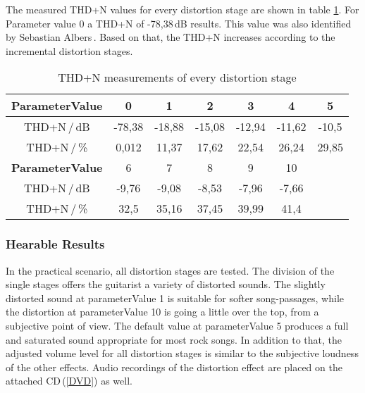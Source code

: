 The measured THD+N values for every distortion stage are shown in table \ref{tab:THDMeasurements}.
For Parameter value 0 a THD+N of -78,38\,dB results. This value was also identified by Sebastian Albers\,\cite[p.\,81]{Albers:2017}. Based on that, the THD+N increases according to the incremental distortion stages.

\begin{table}[H]
\begin{center}



\begin{tabular}{|c||c|c|c|c|c|c|}
 \hline 
\textbf{ParameterValue} & 0 & 1 & 2 & 3 & 4 & 5 \\ 
 \hline 
 THD+N\,/\,dB & -78,38 & -18,88 & -15,08 & -12,94 & -11,62 & -10,5  \\ 
 \hline 
 THD+N\,/\,\% & 0,012 & 11,37 & 17,62 & 22,54 & 26,24 & 29,85\\ 
 \hline
 \hline
 \textbf{ParameterValue} & 6 & 7 & 8 & 9 & 10 &  \\ 
 \hline 
 THD+N\,/\,dB  & -9,76 & -9,08 & -8,53 & -7,96 & -7,66 & \\
 \hline 
 THD+N\,/\,\% & 32,5 & 35,16 & 37,45 & 39,99 & 41,4 &\\
 \hline 
  \end{tabular}
 
\end{center}
\caption{THD+N measurements of every distortion stage}
\label{tab:THDMeasurements}
\end{table}

\subsubsection{Hearable Results}

In the practical scenario, all distortion stages are tested. The division of the single stages offers the guitarist a variety of distorted sounds. The slightly distorted sound at parameterValue 1 is suitable for softer song-passages, while the distortion at parameterValue 10 is going a little over the top, from a subjective point of view.
The default value at parameterValue 5 produces a full and saturated sound appropriate for most rock songs.
In addition to that, the adjusted volume level for all distortion stages is similar to the subjective loudness of the other effects.
Audio recordings of the distortion effect are placed on the attached CD\,(\ref{DVD}) as well.


